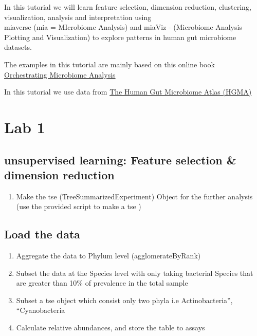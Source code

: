 \documentclass[
  oneside]{book}
\providecommand{\tightlist}{%
  \setlength{\itemsep}{0pt}\setlength{\parskip}{0pt}}
\begin{document}
In this tutorial we will learn feature selection, dimension reduction, clustering, visualization, analysis and interpretation using\\
miaverse (mia = MIcrobiome Analysis) and miaViz - (Microbiome Analysis Plotting and Visualization) to explore patterns in human gut microbiome datasets.

The examples in this tutorial are mainly based on this online book\\
\href{https://microbiome.github.io/OMA/}{Orchestrating Microbiome Analysis}

In this tutorial we use data from \href{https://www.microbiomeatlas.org/}{The Human Gut Microbiome Atlas (HGMA)}

\hypertarget{lab-1}{%
\chapter{Lab 1}\label{lab-1}}

\hypertarget{unsupervised-learning-feature-selection-dimension-reduction}{%
\section{unsupervised learning: Feature selection \& dimension reduction}\label{unsupervised-learning-feature-selection-dimension-reduction}}

\begin{enumerate}
\def\labelenumi{\arabic{enumi}.}
\tightlist
\item
  Make the tse (TreeSummarizedExperiment) Object for the further analysis (use the provided script to make a tse )
\end{enumerate}

\hypertarget{load-the-data}{%
\section{Load the data}\label{load-the-data}}

\begin{enumerate}
\def\labelenumi{\arabic{enumi}.}
\setcounter{enumi}{1}
\item
  Aggregate the data to Phylum level (agglomerateByRank)
\item
  Subset the data at the Species level with only taking bacterial Species that are greater than 10\% of prevalence in the total sample
\item
  Subset a tse object which consist only two phyla i.e Actinobacteria'', ``Cyanobacteria
\item
  Calculate relative abundances, and store the table to assays
\end{enumerate}
\end{document}
